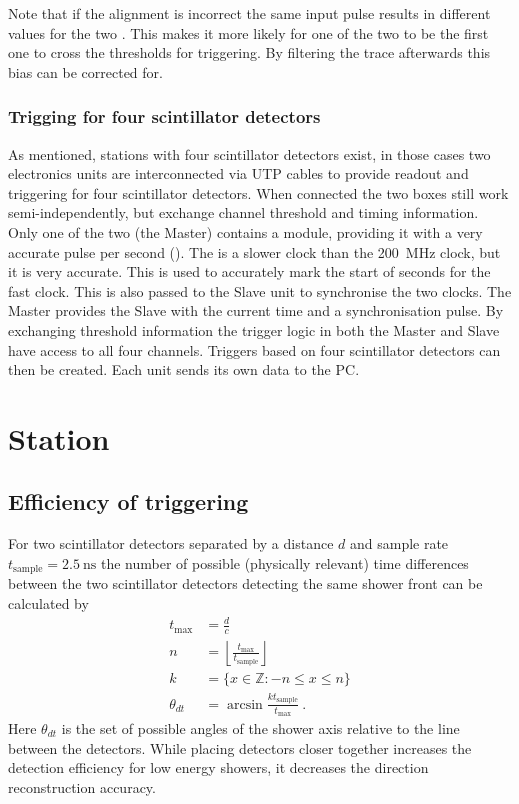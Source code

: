 Note that if the \adc alignment is incorrect the same input pulse results in different \adc values for the two \adcs. This makes it more likely for one of the two \adcs to be the first one to cross the thresholds for triggering. By filtering the trace afterwards this bias can be corrected for.


\subsubsection{Trigging for four scintillator detectors}

As mentioned, stations with four scintillator detectors exist, in those cases two \hisparc electronics units are interconnected via UTP cables to provide readout and triggering for four scintillator detectors. When connected the two boxes still work semi-independently, but exchange channel threshold and timing information. Only one of the two (the Master) contains a \gps module, providing it with a very accurate pulse per second (\pps). The \pps is a slower clock than the \SI{200}{\mega\hertz} clock, but it is very accurate. This \pps is used to accurately mark the start of seconds for the fast clock. This \pps is also passed to the Slave unit to synchronise the two clocks. The Master provides the Slave with the current time and a synchronisation pulse. By exchanging threshold information the trigger logic in both the Master and Slave have access to all four channels. Triggers based on four scintillator detectors can then be created. Each unit sends its own data to the PC.


\section{Station}

\subsection{Efficiency of triggering}

For two scintillator detectors separated by a distance $d$ and sample rate $t_{\mathrm{sample}} = \SI{2.5}{\ns}$ the number of possible (physically relevant) time differences between the two scintillator detectors detecting the same shower front can be calculated by
%
\begin{equation}
    \begin{split}
        t_{\mathrm{max}} &= \frac{d}{c} \\
        n &= \left\lfloor \frac{t_{\mathrm{max}}}{t_{\mathrm{sample}}} \right\rfloor \\
        k &= \{x \in \mathbb{Z} : -n \leq x \leq n \} \\
        \theta_{dt} &= \arcsin \frac{k t_{\mathrm{sample}}}{t_{\mathrm{max}}} \ .
    \end{split}
\end{equation}
%
Here $\theta_{dt}$ is the set of possible angles of the shower axis relative to the line between the detectors. While placing detectors closer together increases the detection efficiency for low energy showers, it decreases the direction reconstruction accuracy.

